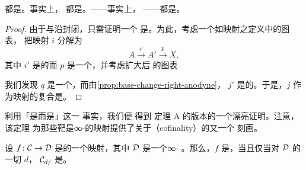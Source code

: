\begin{corollary}\label{cor:left-fibration-smooth}
\trLeftFibration{}都是\trUniversallySmooth{}。事实上，\trCocartesianFibration{}%
都是\trUniversallySmooth{}。\trRightFibration{}——事实上，
\trCartesianFibration{}——都是\trUniversallyProper{}。
\end{corollary}

\begin{proof}
由于\trLeftFibration{}与\trRightFibration{}沿\trPullback{}封闭，只需证明一个%
\trLeftFibration{}是\trSmooth{}。为此，考虑一个如\trSmooth{}映射之定义中的图表，
把映射 $i$
分解为
\[
A \xrightarrow{\ i'\ } A' \xrightarrow{\ p\ } X,
\]
其中 $i'$ 是\trRightAnodyne{}的而 $p$ 是一个\trTrivialFibration{}，并考虑扩大后
的图表
\begin{center}
\end{center}
我们发现 $q$ 是一个\trTrivialFibration{}，而由\cref{prop:base-change-right-anodyne}，
$j'$ 是\trRightAnodyne{}的。于是，$j$ 作为\trCofinal{}映射的复合是\trCofinal{}。
\end{proof}

利用「\trLeftFibration{}是\trSmooth{}而\trRightFibration{}是\trProper{}」这一
事实，我们便
得到 \trQuillen{}定理 A 的\trInfinityCategory{}版本的一个漂亮证明。注意，该定理
为那些靶是∞-\trCategory{}的映射提供了关于\trCofinality{}（cofinality）的又一个
刻画。

\begin{theorem}\label{thm:quillen-theorem-a}
设 $f\colon \mathcal{C} \to \mathcal{D}$ 是\trSimplicialSets{}的一个映射，其中 $\mathcal{D}$ 是一个∞-%
\trCategory{}。那么，$f$ 是\trCofinal{}，当且仅当对 $\mathcal{D}$ 的一切\trObject{} $d$，
\trSimplicialSet{} $\mathcal{C}_{d/}$ 是\trWeaklyContractible{}。
\end{theorem}

